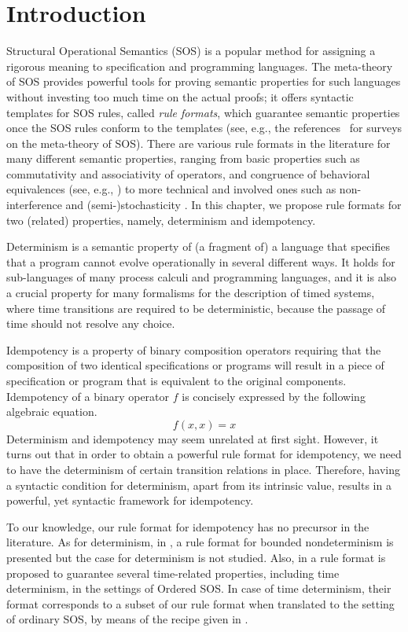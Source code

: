 \section{Introduction}
Structural Operational Semantics (SOS) \cite{Plotkin04a} is a popular method for assigning a rigorous meaning to
specification and programming languages.
The meta-theory of SOS provides powerful tools for proving semantic properties for such languages
without investing too much time on the actual proofs; it offers syntactic templates for SOS rules, called
\emph{rule formats},
which guarantee semantic properties once the SOS rules conform to the templates
(see, e.g., the references~\cite{Aceto01,Mousavi07-TCS} for surveys on the meta-theory of SOS).
There are various rule formats  in the literature for many different semantic properties, 
ranging from basic properties such as commutativity \cite{Mousavi05-IPL} and 
associativity \cite{Mousavi08-CONCUR} of operators, and congruence of behavioral 
equivalences (see, e.g., \cite{Verhoef95}) to more technical and involved ones such as 
non-interference \cite{Tini04} and (semi-)stochasticity \cite{Lanotte05}.
In this chapter, we propose rule formats for two (related) properties, namely, determinism and idempotency.

Determinism is a semantic property of (a  fragment of) a language
that specifies that a program cannot evolve operationally in several different ways.
It holds for sub-languages of many process calculi and programming languages,
and it is also a crucial property for many formalisms for the description of timed systems, where time transitions are required to be deterministic, because the passage of time should not resolve any choice.

Idempotency is a property of binary composition operators requiring
that the composition of two identical specifications or programs
will result in a piece of specification or program that is equivalent to the original components.
Idempotency of a binary operator $f$ is concisely expressed by the following algebraic equation.
\[
f(x, x) = x
\]
Determinism and idempotency may seem unrelated at first sight.
However, it turns out that in order to obtain a powerful rule format
for idempotency, we need to have the determinism of certain transition relations in place. Therefore,
having a syntactic condition for determinism, apart from its intrinsic value,
results in a powerful, yet syntactic framework for idempotency.


To our knowledge, our rule format for idempotency has no precursor in the literature.
As for determinism, in \cite{Fokkink03a}, a rule format for bounded nondeterminism is presented but the case for determinism is not studied.
Also, in \cite{Ulidowski97b} a rule format is proposed to guarantee several time-related properties, including time determinism, in the settings of
Ordered SOS. In case of time determinism, their format corresponds to a subset of our rule format when translated to the setting of ordinary SOS, by means of the recipe given in \cite{Mousavi06-FSTTCS}.

